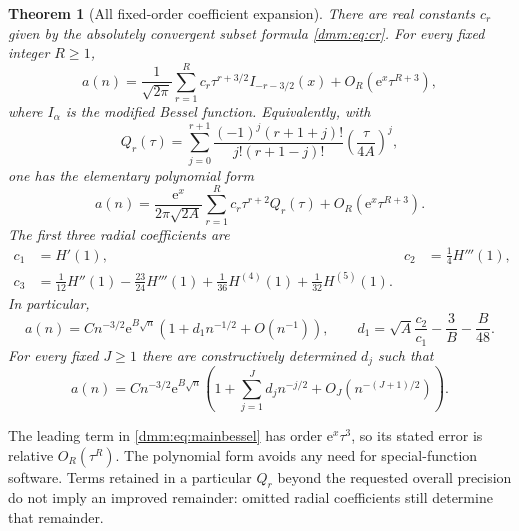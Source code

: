 \documentclass[11pt,letterpaper]{article}
\numberwithin{equation}{section}
\newtheorem{theorem}{Theorem}[section]
\theoremstyle{definition}\newtheorem{definition}[theorem]{Definition}
\theoremstyle{remark}\newtheorem{remark}[theorem]{Remark}
\newcommand{\ee}{\mathrm e}
\begin{document}
\begin{theorem}[All fixed-order coefficient expansion]\label{dmm:thm:main}
There are real constants $c_r$ given by the absolutely convergent subset formula \eqref{dmm:eq:cr}. For every fixed integer $R\ge1$,
\begin{equation}\label{dmm:eq:mainbessel}
a(n)=\frac1{\sqrt{2\pi}}\sum_{r=1}^{R}
c_r\tau^{r+3/2}I_{-r-3/2}(x)
+O_R\!\left(\ee^x\tau^{R+3}\right),
\end{equation}
where $I_\alpha$ is the modified Bessel function. Equivalently, with
\begin{equation}\label{dmm:eq:Qr}
Q_r(\tau)=\sum_{j=0}^{r+1}
\frac{(-1)^j(r+1+j)!}{j!(r+1-j)!}
\left(\frac{\tau}{4A}\right)^j,
\end{equation}
one has the elementary polynomial form
\begin{equation}\label{dmm:eq:mainpoly}
a(n)=\frac{\ee^x}{2\pi\sqrt{2A}}
\sum_{r=1}^{R}c_r\tau^{r+2}Q_r(\tau)
+O_R\!\left(\ee^x\tau^{R+3}\right).
\end{equation}
The first three radial coefficients are
\begin{align}\label{dmm:eq:firstcr}
c_1&=H'(1),& c_2&=\frac14H'''(1),\\
c_3&=\frac1{12}H''(1)-\frac{23}{24}H'''(1)
+\frac1{36}H^{(4)}(1)+\frac1{32}H^{(5)}(1).\nonumber
\end{align}
In particular,
\begin{equation}\label{dmm:eq:forwardn}
a(n)=C n^{-3/2}\ee^{B\sqrt n}
\left(1+d_1n^{-1/2}+O(n^{-1})\right),\qquad
 d_1=\sqrt A\frac{c_2}{c_1}-\frac3B-\frac B{48}.
\end{equation}
For every fixed $J\ge1$ there are constructively determined $d_j$ such that
\begin{equation}\label{dmm:eq:allforwardn}
a(n)=C n^{-3/2}\ee^{B\sqrt n}
\left(1+\sum_{j=1}^{J}d_jn^{-j/2}
+O_J(n^{-(J+1)/2})\right).
\end{equation}
\end{theorem}
The leading term in \eqref{dmm:eq:mainbessel} has order $\ee^x\tau^3$, so its stated error is relative $O_R(\tau^R)$. The polynomial form avoids any need for special-function software. Terms retained in a particular $Q_r$ beyond the requested overall precision do not imply an improved remainder: omitted radial coefficients still determine that remainder.
\end{document}
